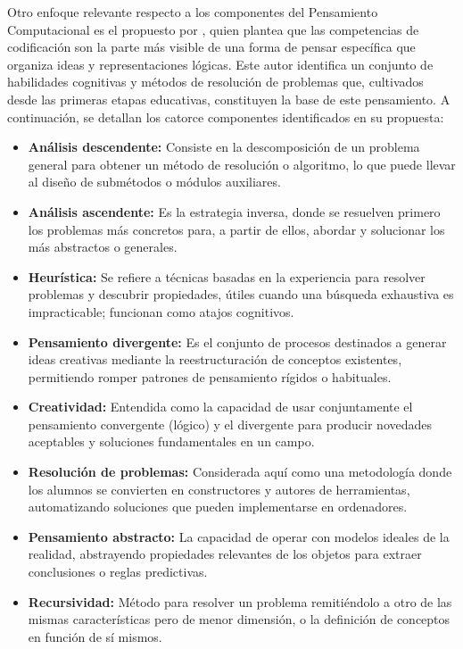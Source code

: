 Otro enfoque relevante respecto a los componentes del Pensamiento Computacional es el propuesto por , quien plantea que las competencias de codificación son la parte más visible de una forma de pensar específica que organiza ideas y representaciones lógicas. Este autor identifica un conjunto de habilidades cognitivas y métodos de resolución de problemas que, cultivados desde las primeras etapas educativas, constituyen la base de este pensamiento. A continuación, se detallan los catorce componentes identificados en su propuesta:

\begin{itemize}
    \item \textbf{Análisis descendente:} Consiste en la descomposición de un problema general para obtener un método de resolución o algoritmo, lo que puede llevar al diseño de submétodos o módulos auxiliares.
    \item \textbf{Análisis ascendente:} Es la estrategia inversa, donde se resuelven primero los problemas más concretos para, a partir de ellos, abordar y solucionar los más abstractos o generales.
    \item \textbf{Heurística:} Se refiere a técnicas basadas en la experiencia para resolver problemas y descubrir propiedades, útiles cuando una búsqueda exhaustiva es impracticable; funcionan como atajos cognitivos.
    \item \textbf{Pensamiento divergente:} Es el conjunto de procesos destinados a generar ideas creativas mediante la reestructuración de conceptos existentes, permitiendo romper patrones de pensamiento rígidos o habituales.
    \item \textbf{Creatividad:} Entendida como la capacidad de usar conjuntamente el pensamiento convergente (lógico) y el divergente para producir novedades aceptables y soluciones fundamentales en un campo.
    \item \textbf{Resolución de problemas:} Considerada aquí como una metodología donde los alumnos se convierten en constructores y autores de herramientas, automatizando soluciones que pueden implementarse en ordenadores.
    \item \textbf{Pensamiento abstracto:} La capacidad de operar con modelos ideales de la realidad, abstrayendo propiedades relevantes de los objetos para extraer conclusiones o reglas predictivas.
    \item \textbf{Recursividad:} Método para resolver un problema remitiéndolo a otro de las mismas características pero de menor dimensión, o la definición de conceptos en función de sí mismos.

\end{itemize}
